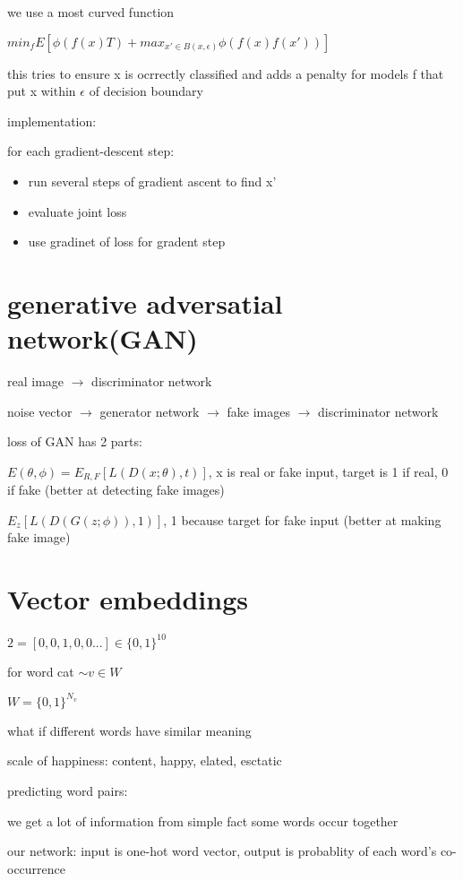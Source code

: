 \documentclass[10pt]{article}
\theoremstyle{break}
\begin{document}
we use a most curved function

$min_f E[\phi(f(x)T)+ max_{x'\in B(x,\epsilon)}\phi(f(x)f(x'))]$

this tries to ensure x is ocrrectly classified and adds a penalty for models f that put x within $\epsilon$ of decision boundary

implementation:

for each gradient-descent step:
\begin{itemize}
    \item run several steps of gradient ascent to find x'
    \item evaluate joint loss 
    \item use gradinet of loss for gradent step
\end{itemize}


\section{generative adversatial network(GAN)}

real image $\rightarrow$ discriminator network 

noise vector $\rightarrow$ generator network $\rightarrow$ fake images $\rightarrow$ discriminator network

loss of GAN has 2 parts: 

$E(\theta , \phi) = E_{R,F}[L(D(x;\theta), t)]$, x is real or fake input, target is 1 if real, 0 if fake (better at detecting fake images)

$E_z[L(D(G(z;\phi)),1)]$, 1 because target for fake input (better at making fake image)



\section{Vector embeddings}
$2=[0,0,1,0,0...]\in\{0,1\}^{10}$

for word cat $\sim v \in W$

$W = \{0,1\}^{N_v}$

what if different words have similar meaning

scale of happiness: content, happy, elated, esctatic

predicting word pairs: 

we get a lot of information from simple fact some words occur together

our network: input is one-hot word vector, output is probablity of each word's co-occurrence 
\end{document}
